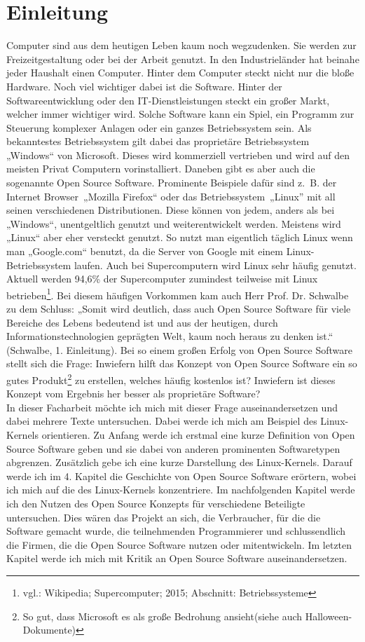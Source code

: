 \documentclass[a4paper,12pt]{article}
\begin{document}
\section{Einleitung}
Computer sind aus dem heutigen Leben kaum noch wegzudenken. Sie werden zur Freizeitgestaltung oder bei der Arbeit genutzt. In den Industrieländer hat beinahe jeder Haushalt einen Computer. Hinter dem Computer steckt nicht nur die bloße Hardware. Noch viel wichtiger dabei ist die Software. Hinter der Softwareentwicklung oder den IT-Dienstleistungen steckt ein großer Markt, welcher immer wichtiger wird. Solche Software kann ein Spiel, ein Programm zur Steuerung komplexer Anlagen oder ein ganzes Betriebssystem sein. Als bekanntestes Betriebssystem gilt dabei das proprietäre Betriebssystem „Windows“ von Microsoft. Dieses wird kommerziell vertrieben und wird auf den meisten Privat Computern vorinstalliert. Daneben gibt es aber auch die sogenannte Open Source Software. Prominente Beispiele dafür sind z.~B. der Internet Browser~„Mozilla Firefox“ oder das Betriebssystem~„Linux” mit all seinen verschiedenen Distributionen. Diese können von jedem, anders als bei „Windows“, unentgeltlich genutzt und weiterentwickelt werden. Meistens wird „Linux“ aber eher versteckt genutzt. So nutzt man eigentlich täglich Linux wenn man „Google.com“ benutzt, da die Server von Google mit einem Linux-Betriebssystem laufen. Auch bei Supercomputern wird Linux sehr häufig genutzt. Aktuell werden 94,6\% der Supercomputer zumindest teilweise mit Linux betrieben\footnote{vgl.: Wikipedia; Supercomputer; 2015; Abschnitt: Betriebssysteme}. Bei diesem häufigen Vorkommen kam auch Herr Prof. Dr. Schwalbe zu dem Schluss: „Somit wird deutlich, dass auch Open Source Software für viele Bereiche des Lebens bedeutend ist und aus der heutigen, durch Informationstechnologien geprägten Welt, kaum noch heraus zu denken ist.“ (Schwalbe, 1. Einleitung). Bei so einem großen Erfolg von Open Source Software stellt sich die Frage: Inwiefern hilft das Konzept von Open Source Software ein so gutes Produkt\footnote{So gut, dass Microsoft es als große Bedrohung ansieht(siehe auch Halloween-Dokumente)} zu erstellen, welches häufig kostenlos ist? Inwiefern ist dieses Konzept vom Ergebnis her besser als proprietäre Software?\\
In dieser Facharbeit möchte ich mich mit dieser Frage auseinandersetzen und dabei mehrere Texte untersuchen. Dabei werde ich mich am Beispiel des Linux-Kernels orientieren. Zu Anfang werde ich erstmal eine kurze Definition von Open Source Software geben und sie dabei von anderen prominenten Softwaretypen abgrenzen. Zusätzlich gebe ich eine kurze Darstellung des Linux-Kernels. Darauf werde ich im 4. Kapitel die Geschichte von Open Source Software erörtern, wobei ich mich auf die des Linux-Kernels konzentriere. Im nachfolgenden Kapitel werde ich den Nutzen des Open Source Konzepts für verschiedene Beteiligte untersuchen. Dies wären das Projekt an sich, die Verbraucher, für die die Software gemacht wurde, die teilnehmenden Programmierer und schlussendlich die Firmen, die die Open Source Software nutzen oder mitentwickeln. Im letzten Kapitel werde ich mich mit Kritik an Open Source Software auseinandersetzen.
\end{document}
